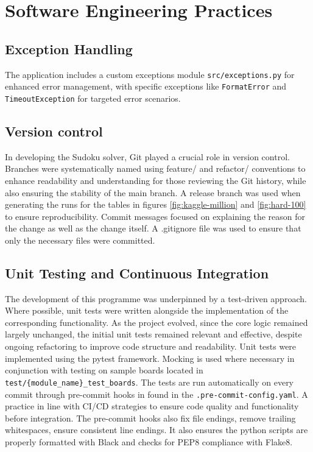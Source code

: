 \documentclass[11pt]{article}
\begin{document}
\section{Software Engineering Practices}

\subsection{Exception Handling}
The application includes a custom exceptions module \texttt{src/exceptions.py} for enhanced error management, with specific exceptions like \texttt{FormatError} and \texttt{TimeoutException} for targeted error scenarios.

\subsection{Version control}
In developing the Sudoku solver, Git played a crucial role in version control. Branches were systematically named using feature/ and refactor/ conventions to enhance readability and understanding for those reviewing the Git history, while also ensuring the stability of the main branch. A release branch was used when generating the runs for the tables in figures \ref{fig:kaggle-million} and \ref{fig:hard-100} to ensure reproducibility. Commit messages focused on explaining the reason for the change as well as the change itself. A .gitignore file was used to ensure that only the necessary files were committed. 

\subsection{Unit Testing and Continuous Integration}
The development of this programme was underpinned by a test-driven approach. Where possible, unit tests were written alongside the implementation of the corresponding functionality. As the project evolved, since the core logic remained largely unchanged, the initial unit tests remained relevant and effective, despite ongoing refactoring to improve code structure and readability. Unit tests were implemented using the pytest framework. Mocking is used where necessary in conjunction with testing on sample boards located in \texttt{test/\{module\_name\}\_test\_boards}. 
The tests are run automatically on every commit through pre-commit hooks in found in the \texttt{.pre-commit-config.yaml}. A practice in line with CI/CD strategies to ensure code quality and functionality before integration. The pre-commit hooks also fix file endings, remove trailing whitespaces, ensure consistent line endings. It also ensures the python scripts are properly formatted with Black and checks for PEP8 compliance with Flake8.
\end{document}
